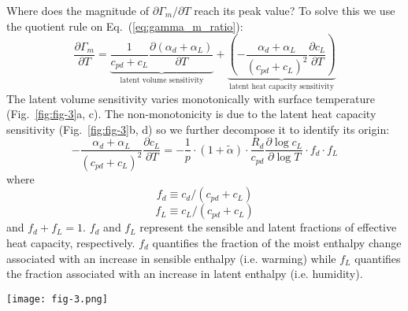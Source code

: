 \documentclass[draft,twocol]{ametsocV6.1}
\begin{document}
Where does the magnitude of $\partial\Gamma_m/\partial T$ reach its peak value? To solve this we use the quotient rule on Eq.~(\ref{eq:gamma_m_ratio}):
\begin{equation}
\frac{\partial\Gamma_m}{\partial T} = \underbrace{\frac{1}{c_{pd} + c_L}\frac{\partial(\alpha_d + \alpha_L)}{\partial T}}_{\text{latent volume sensitivity}} + \underbrace{\left(-\frac{\alpha_d + \alpha_L}{(c_{pd} + c_L)^2}\frac{\partial c_L}{\partial T}\right)}_{\text{latent heat capacity sensitivity}} \label{eq:decomposition}
\end{equation}
The latent volume sensitivity varies monotonically with surface temperature (Fig.~\ref{fig:fig-3}a, c). The non-monotonicity is due to the latent heat capacity sensitivity (Fig.~\ref{fig:fig-3}b, d) so we further decompose it to identify its origin:
\begin{equation}
-\frac{\alpha_d + \alpha_L}{(c_{pd} + c_L)^2}\frac{\partial c_L}{\partial T} = -\frac{1}{p} \cdot \left(1 + \tilde{\alpha}\right) \cdot \frac{R_d}{c_{pd}}\frac{\partial\log{c_L}}{\partial \log{T}} \cdot f_d \cdot f_L \label{eq:term_b_intermediate}
\end{equation}
where
\begin{equation}
f_d \equiv c_{d}/(c_{pd} + c_L) \label{eq:f_d}
\end{equation}
\begin{equation}
f_L \equiv c_{L}/(c_{pd} + c_L) \label{eq:f_L}
\end{equation}
and $f_d + f_L = 1$. $f_d$ and $f_L$ represent the sensible and latent fractions of effective heat capacity, respectively. $f_d$ quantifies the fraction of the moist enthalpy change associated with an increase in sensible enthalpy (i.e. warming) while $f_L$ quantifies the fraction associated with an increase in latent enthalpy (i.e. humidity).

\begin{figure*}[htbp]
 \centering
 \texttt{[image: fig-3.png]}\\
 \caption{The moist adiabatic lapse rate sensitivity to local temperature $T$, $\partial \Gamma_m/\partial T$ (Fig.~\ref{fig:fig-2}c), is decomposed into contributions from (a) the latent volume sensivity and (b) the latent heat capacity sensitivity following Eq.~(\ref{eq:decomposition}). (c) The latent volume sensitivity monotonically increases increases with local temperature $T$ across all pressure levels, e.g. across 500, 400, 300, and 200~hPa. (d) The latent heat capacity sensitivity has a local minimum that shifts toward warmer surface temperature at higher levels, consistent with the behavior of $d \Gamma_m/dT_s$ (Fig.~\ref{fig:fig-2}b).}\label{fig:fig-3}
\end{figure*}
\end{document}
